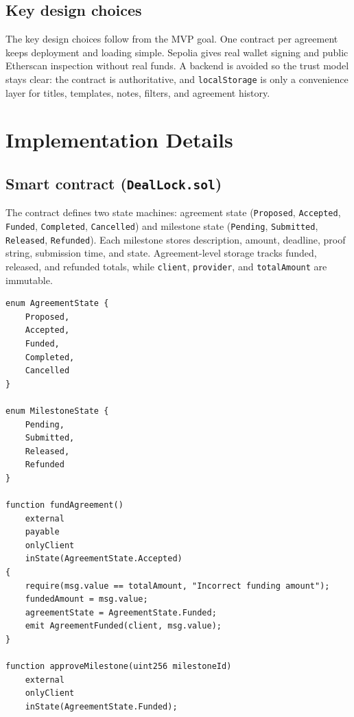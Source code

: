 \documentclass[12pt,a4paper]{article}
\begin{document}
\subsection{Key design choices}

The key design choices follow from the MVP goal. One contract per agreement
keeps deployment and loading simple. Sepolia gives real wallet signing and public
Etherscan inspection without real funds. A backend is avoided so the trust model
stays clear: the contract is authoritative, and \texttt{localStorage} is only a
convenience layer for titles, templates, notes, filters, and agreement history.

\newpage
\section{Implementation Details}
\label{sec:implementation}

\subsection{Smart contract (\texttt{DealLock.sol})}

The contract defines two state machines: agreement state
(\texttt{Proposed}, \texttt{Accepted}, \texttt{Funded}, \texttt{Completed},
\texttt{Cancelled}) and milestone state (\texttt{Pending}, \texttt{Submitted},
\texttt{Released}, \texttt{Refunded}). Each milestone stores description,
amount, deadline, proof string, submission time, and state. Agreement-level
storage tracks funded, released, and refunded totals, while \texttt{client},
\texttt{provider}, and \texttt{totalAmount} are immutable.

\begin{lstlisting}[style=solidity, caption={Core state model and entry points.}, label={lst:contract-core}]
enum AgreementState {
    Proposed,
    Accepted,
    Funded,
    Completed,
    Cancelled
}

enum MilestoneState {
    Pending,
    Submitted,
    Released,
    Refunded
}

function fundAgreement()
    external
    payable
    onlyClient
    inState(AgreementState.Accepted)
{
    require(msg.value == totalAmount, "Incorrect funding amount");
    fundedAmount = msg.value;
    agreementState = AgreementState.Funded;
    emit AgreementFunded(client, msg.value);
}

function approveMilestone(uint256 milestoneId)
    external
    onlyClient
    inState(AgreementState.Funded);
\end{lstlisting}
\end{document}
